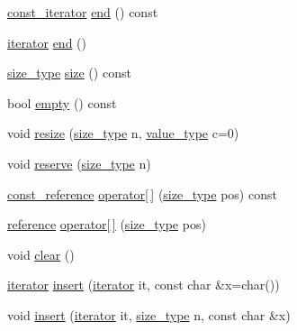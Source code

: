 \begin{DoxyCompactItemize}
\item 
\hyperlink{class_c_data_stream_abcfd79b72607505b22f18424e313b4c5}{const\+\_\+iterator} \hyperlink{class_c_data_stream_a1c22182691412ed9e0a30b719d388f31}{end} () const 
\item 
\hyperlink{class_c_data_stream_abed2013224bdf424e51c78bf483886d3}{iterator} \hyperlink{class_c_data_stream_a6a486e8e0da9e769520de62b15bd9315}{end} ()
\item 
\hyperlink{class_c_data_stream_a79e10daad6db0f94aea1e811eb167378}{size\+\_\+type} \hyperlink{class_c_data_stream_ac6567f6d600d644d9855b52bb59049cd}{size} () const 
\item 
bool \hyperlink{class_c_data_stream_a6e50e788d33080ac804e4d8ba7150279}{empty} () const 
\item 
void \hyperlink{class_c_data_stream_aa91abddde56127bd3d6ac2a0fb005874}{resize} (\hyperlink{class_c_data_stream_a79e10daad6db0f94aea1e811eb167378}{size\+\_\+type} n, \hyperlink{class_c_data_stream_a5572ddd57b7355f87781b89087dd18e0}{value\+\_\+type} c=0)
\item 
void \hyperlink{class_c_data_stream_a5542e71bd7af2ab7cd7be0f381d39cb5}{reserve} (\hyperlink{class_c_data_stream_a79e10daad6db0f94aea1e811eb167378}{size\+\_\+type} n)
\item 
\hyperlink{class_c_data_stream_ada2ac4b4c962dd5a5dcccbc3f71e83ab}{const\+\_\+reference} \hyperlink{class_c_data_stream_a7a93b7db1ac1aca5c3e3831a794d9134}{operator\mbox{[}$\,$\mbox{]}} (\hyperlink{class_c_data_stream_a79e10daad6db0f94aea1e811eb167378}{size\+\_\+type} pos) const 
\item 
\hyperlink{class_c_data_stream_a33723921305add93b45973243faf1541}{reference} \hyperlink{class_c_data_stream_a91a057dd6e866137a7d526bd253fa8e9}{operator\mbox{[}$\,$\mbox{]}} (\hyperlink{class_c_data_stream_a79e10daad6db0f94aea1e811eb167378}{size\+\_\+type} pos)
\item 
void \hyperlink{class_c_data_stream_ade6ed9a3a481e333900e6496707b9692}{clear} ()
\item 
\hyperlink{class_c_data_stream_abed2013224bdf424e51c78bf483886d3}{iterator} \hyperlink{class_c_data_stream_a191a18802fbc0861ae118d79d33088dc}{insert} (\hyperlink{class_c_data_stream_abed2013224bdf424e51c78bf483886d3}{iterator} it, const char \&x=char())
\item 
void \hyperlink{class_c_data_stream_ac8fa6a4a4cd08da5a0c87180834611e5}{insert} (\hyperlink{class_c_data_stream_abed2013224bdf424e51c78bf483886d3}{iterator} it, \hyperlink{class_c_data_stream_a79e10daad6db0f94aea1e811eb167378}{size\+\_\+type} n, const char \&x)

\end{DoxyCompactItemize}
